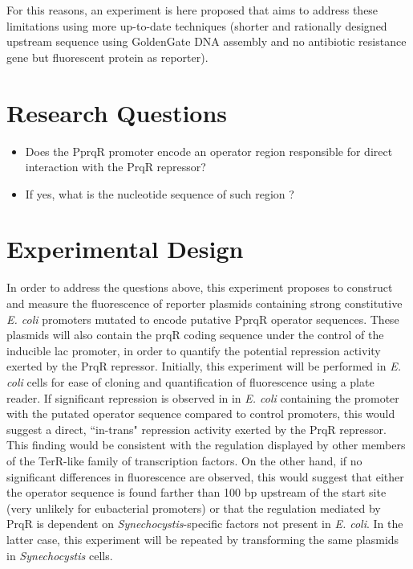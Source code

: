 For this reasons, an experiment is here proposed that aims to address these limitations using more up-to-date techniques (shorter and rationally designed upstream sequence using GoldenGate DNA assembly and no antibiotic resistance gene but fluorescent protein as reporter). 

\section*{Research Questions}
\begin{itemize}
    \item Does the PprqR promoter encode an operator region responsible for direct interaction with the PrqR repressor?
    \item If yes, what is the nucleotide sequence of such region ?
\end{itemize}

\section*{Experimental Design}
In order to address the questions above, this experiment proposes to construct and measure the fluorescence of reporter plasmids containing strong constitutive \textit{E. coli} promoters mutated to encode putative PprqR operator sequences. These plasmids will also contain the prqR coding sequence under the control of the inducible lac promoter, in order to quantify the potential repression activity exerted by the PrqR repressor.
Initially, this experiment will be performed in \textit{E. coli} cells for ease of cloning and quantification of fluorescence using a plate reader. If significant repression is observed in in \textit{E. coli} containing the promoter with the putated operator sequence compared to control promoters, this would suggest a direct, ``in-trans" repression activity exerted by the PrqR repressor. This finding would be consistent with the regulation displayed by other members of the TerR-like family of transcription factors. 
On the other hand, if no significant differences in fluorescence are observed, this would suggest that either the operator sequence is found farther than 100 bp upstream of the start site (very unlikely for eubacterial promoters) or that the regulation mediated by PrqR is dependent on \textit{Synechocystis}-specific factors not present in \textit{E. coli}. In the latter case, this experiment will be repeated by transforming the same plasmids in \textit{Synechocystis} cells.

